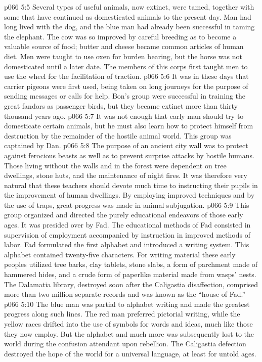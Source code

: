 \vs p066 5:5 Several types of useful animals, now extinct, were tamed, together with some that have continued as domesticated animals to the present day. Man had long lived with the dog, and the blue man had already been successful in taming the elephant. The cow was so improved by careful breeding as to become a valuable source of food; butter and cheese became common articles of human diet. Men were taught to use oxen for burden bearing, but the horse was not domesticated until a later date. The members of this corps first taught men to use the wheel for the facilitation of traction.
\vs p066 5:6 It was in these days that carrier pigeons were first used, being taken on long journeys for the purpose of sending messages or calls for help. Bon’s group were successful in training the great fandors as passenger birds, but they became extinct more than thirty thousand years ago.
\pc \vs p066 5:7 \bibnobreakspace {} It was not enough that early man should try to domesticate certain animals, but he must also learn how to protect himself from destruction by the remainder of the hostile animal world. This group was captained by Dan.\plusone
\vs p066 5:8 The purpose of an ancient city wall was to protect against ferocious beasts as well as to prevent surprise attacks by hostile humans. Those living without the walls and in the forest were dependent on tree dwellings, stone huts, and the maintenance of night fires. It was therefore very natural that these teachers should devote much time to instructing their pupils in the improvement of human dwellings. By employing improved techniques and by the use of traps, great progress was made in animal subjugation.
\pc \vs p066 5:9 \bibnobreakspace {} This group organized and directed the purely educational endeavors of those early ages. It was presided over by Fad. The educational methods of Fad consisted in supervision of employment accompanied by instruction in improved methods of labor. Fad formulated the first alphabet and introduced a writing system. This alphabet contained twenty\hyp{}five characters. For writing material these early peoples utilized tree barks, clay tablets, stone slabs, a form of parchment made of hammered hides, and a crude form of paperlike material made from wasps’ nests. The Dalamatia library, destroyed soon after the Caligastia disaffection, comprised more than two million separate records and was known as the “house of Fad.”
\vs p066 5:10 The blue man was partial to alphabet writing and made the greatest progress along such lines. The red man preferred pictorial writing, while the yellow races drifted into the use of symbols for words and ideas, much like those they now employ. But the alphabet and much more was subsequently lost to the world during the confusion attendant upon rebellion. The Caligastia defection destroyed the hope of the world for a universal language, at least for untold ages.
